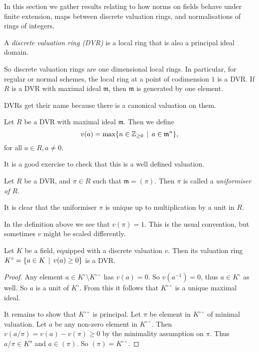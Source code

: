 In this section we gather results relating to how norms on fields behave under finite extension, maps between discrete valuation rings, and normalisations of rings of integers. 

\begin{definition}
	A \emph{discrete valuation ring (\gls{DVR})} is a local ring that is also a principal ideal domain. 
\end{definition}

So discrete valuation rings are one dimensional local rings. 
In particular, for regular or normal schemes, the local ring at a point of codimension $1$ is a DVR.
If $R$ is a DVR with maximal ideal $\mathfrak{m} $, then $\mathfrak{m} $ is generated by one element. 

DVRs get their name because there is a canonical valuation on them. 
\begin{definition}
	Let $R$ be a DVR with maximal ideal $\mathfrak{m}$. 
	Then we define \[
		v(a) = \max \{n \in \Z_{\ge 0 } \st a \in \mathfrak{m} ^{n} \} 
	,\] 
	for all $a \in R, a \ne 0$. 
\end{definition}
It is a good exercise to check that this is a well defined valuation. 
\begin{definition}
	Let $R$ be a DVR, and $\pi \in R$ such that $\mathfrak{m}  = (\pi)$. 
	Then $\pi$ is called a \emph{uniformiser of $R$}. 
\end{definition}
It is clear that the uniformiser $\pi$ is unique up to multiplication by a unit in $R$. 
\begin{remark}
	In the definition above we see that $v(\pi) = 1$. 
	This is the usual convention, but sometimes $v$ might be scaled differently. 
\end{remark}

\begin{lemma}
	Let $K$ be a field, equipped with a discrete valuation $v$. 
	Then its valuation ring $K^{\circ} = \{a \in K\st v(a) \ge 0\} $ is a DVR. 
\end{lemma}
\begin{proof}
	Any element $a \in K^{\circ} \setminus K^{\circ \circ} $ has $v(a) = 0$. 
	So $v(a^{-1}) = 0$, thus $a \in K^{\circ}$ as well. 
	So  $a$ is a unit of $K^{\circ}$. 
	From this it follows that $K^{\circ\circ}$ is a unique maximal ideal. 
	
	It remains to show that $K^{\circ \circ }$ is principal.  
	Let $\pi$ be element in ${K^{\circ \circ}}$ of minimal valuation. 
	Let $a$ be any non-zero element in $K^{\circ \circ}$. 
	Then $v(a/ \pi) = v(a) - v(\pi) \ge 0$ by the minimality assumption on $\pi$. 
	Thus $a / \pi \in K^{o}$ and $a \in (\pi)$. 
	So $(\pi) = K^{\circ \circ} $. 
\end{proof}

